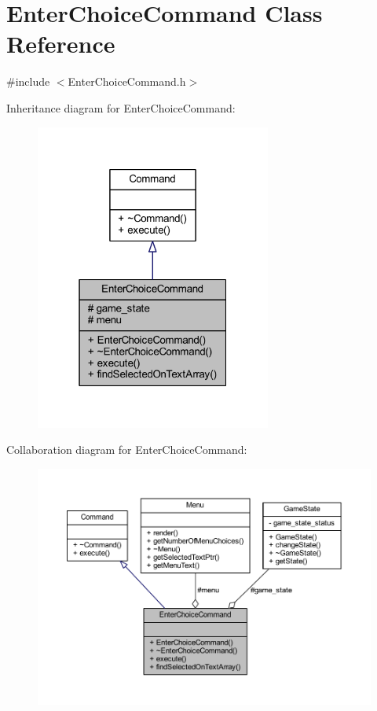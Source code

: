 \hypertarget{class_enter_choice_command}{}\section{Enter\+Choice\+Command Class Reference}
\label{class_enter_choice_command}


{\ttfamily \#include $<$Enter\+Choice\+Command.\+h$>$}



Inheritance diagram for Enter\+Choice\+Command\+:\nopagebreak
\begin{figure}[H]
\begin{center}
\leavevmode
\includegraphics[width=220pt]{class_enter_choice_command__inherit__graph}
\end{center}
\end{figure}


Collaboration diagram for Enter\+Choice\+Command\+:\nopagebreak
\begin{figure}[H]
\begin{center}
\leavevmode
\includegraphics[width=350pt]{class_enter_choice_command__coll__graph}
\end{center}
\end{figure}
